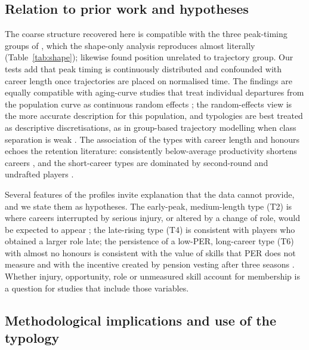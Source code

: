 \subsection{Relation to prior work and hypotheses}

The coarse structure recovered here is compatible with the three peak-timing groups of \citet{wakim2014}, which the shape-only analysis reproduces almost literally (Table~\ref{tab:shape}); \citet{wakim2014} likewise found position unrelated to trajectory group. Our tests add that peak timing is continuously distributed and confounded with career length once trajectories are placed on normalised time. The findings are equally compatible with aging-curve studies that treat individual departures from the population curve as continuous random effects \citep{vaci2019,elijah2025}; the random-effects view is the more accurate description for this population, and typologies are best treated as descriptive discretisations, as in group-based trajectory modelling when class separation is weak \citep{nagin2005}. The association of the types with career length and honours echoes the retention literature: consistently below-average productivity shortens careers \citep{deutscher2017,coates2010}, and the short-career types are dominated by second-round and undrafted players \citep{berri2011draft,motomura2016}.

Several features of the profiles invite explanation that the data cannot provide, and we state them as hypotheses. The early-peak, medium-length type (T2) is where careers interrupted by serious injury, or altered by a change of role, would be expected to appear \citep{drakos2010,harris2013,defroda2021}; the late-rising type (T4) is consistent with players who obtained a larger role late; the persistence of a low-PER, long-career type (T6) with almost no honours is consistent with the value of skills that PER does not measure \citep{kubatko2007,berri2010} and with the incentive created by pension vesting after three seasons \citep{nbpa2023}. Whether injury, opportunity, role or unmeasured skill account for membership is a question for studies that include those variables.

\subsection{Methodological implications and use of the typology}

